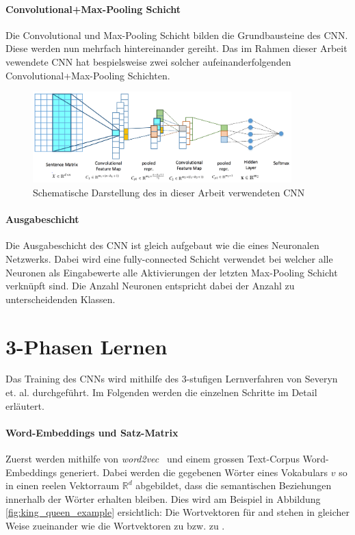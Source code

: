 \paragraph{Convolutional+Max-Pooling Schicht} Die Convolutional und Max-Pooling Schicht bilden die Grundbausteine des CNN. Diese werden nun mehrfach hintereinander gereiht. Das im Rahmen dieser Arbeit vewendete CNN hat bespielsweise zwei solcher aufeinanderfolgenden Convolutional+Max-Pooling Schichten.

\begin{figure}[h]
	\centering
	\includegraphics[width=10cm]{img/semeval_cnn_structure}
	\caption{Schematische Darstellung des in dieser Arbeit verwendeten CNN \protect\cite{deriu2016swisscheese}}
\end{figure}

\paragraph{Ausgabeschicht}\label{basic:cnn:output_layer} Die Ausgabeschicht des CNN ist gleich aufgebaut wie die eines  Neuronalen Netzwerks. Dabei wird eine fully-connected Schicht verwendet bei welcher alle Neuronen als Eingabewerte alle Aktivierungen der letzten Max-Pooling Schicht verknüpft sind. Die Anzahl Neuronen entspricht dabei der Anzahl zu unterscheidenden Klassen.

\section{3-Phasen Lernen}

Das Training des CNNs wird mithilfe des 3-stufigen Lernverfahren von Severyn et. al. \cite{Severyn:2015kta} durchgeführt. Im Folgenden werden die einzelnen Schritte im Detail erläutert.

\paragraph{Word-Embeddings und Satz-Matrix} Zuerst werden mithilfe von \emph{word2vec}~\cite{mikolov2013distributed} und einem grossen Text-Corpus Word-Embeddings generiert. Dabei werden die gegebenen Wörter eines Vokabulars $v$ so in einen reelen Vektorraum $\mathbb{R}^d$ abgebildet, dass die semantischen Beziehungen innerhalb der Wörter erhalten bleiben. Dies wird am Beispiel in Abbildung \ref{fig:king_queen_example} ersichtlich: Die Wortvektoren für  and  stehen in gleicher Weise zueinander wie die Wortvektoren  zu  bzw.  zu .

